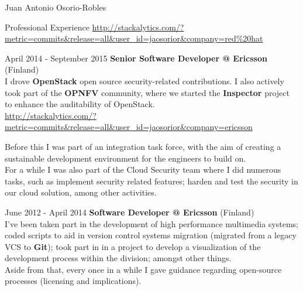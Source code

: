 \documentclass[english,10pt,letterpaper]{article}
\begin{document}
\begin{cv}{Juan Antonio Osorio-Robles}
\begin{cvlist}{Professional Experience}
            \href{http://stackalytics.com/?metric=commits&release=all&user_id=jaosorior&company=red\%20hat}
            {\url{http://stackalytics.com/?metric=commits&release=all&user_id=jaosorior&company=red\%20hat}}

		\item [April 2014 - September 2015]
            \textbf{Senior Software Developer @ Ericsson} (Finland)\\
            I drove \textbf{OpenStack} open source security-related
            contributions. I also actively took part of the \textbf{OPNFV}
            community, where we started the \textbf{Inspector} project to
            enhance the auditability of OpenStack. \\

            \href{http://stackalytics.com/?metric=commits&release=all&user_id=jaosorior&company=ericsson}
            {\url{http://stackalytics.com/?metric=commits&release=all&user_id=jaosorior&company=ericsson}}

            Before this I was part of an integration task force, with the
            aim of creating a sustainable development environment for
            the engineers to build on.\\

            For a while I was also part of the Cloud Security team where
            I did numerous tasks, such as implement security related
            features; harden and test the security in our cloud solution,
            among other activities.

		\item [June 2012 - April 2014]
            \textbf{Software Developer @ Ericsson} (Finland)\\
            I've been taken part in the development of high performance
            multimedia systems; coded scripts to aid in version control
            systems migration (migrated from a legacy VCS to \textbf{Git});
            took part in in a project to develop a visualization of the
            development process within the division; amongst other things.\\

            Aside from that, every once in a while I gave guidance
            regarding open-source processes (licensing and implications).


\end{cvlist}
\end{cv}
\end{document}
